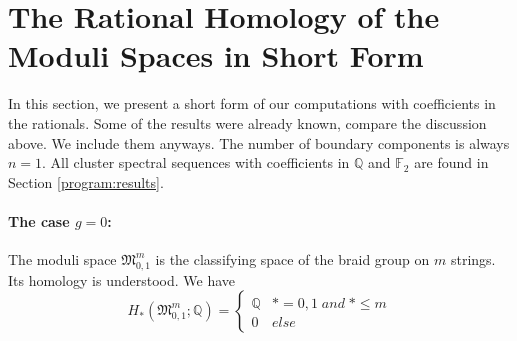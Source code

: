 \section{The Rational Homology of the Moduli Spaces in Short Form}
\label{introduction:more_rational_homology}
In this section, we present a short form of our computations with coefficients in the rationals.
Some of the results were already known, compare the discussion above.
We include them anyways.
The number of boundary components is always $n=1$.
All cluster spectral sequences with coefficients in $\mathbb Q$ and $\mathbb F_2$ are found in Section \ref{program:results}.

\paragraph{The case \texorpdfstring{$g=0$}{g=0}:}
The moduli space $\mathfrak M_{0,1}^m$ is the classifying space of the braid group on $m$ strings.
Its homology is understood.
We have
\[
    H_\ast(\mathfrak M_{0,1}^m; \mathbb Q) =
        \begin{cases}
            \mathbb Q   & \ast = 0,1 \; and\; \ast \le m \\
            0           & else
        \end{cases}
\]

